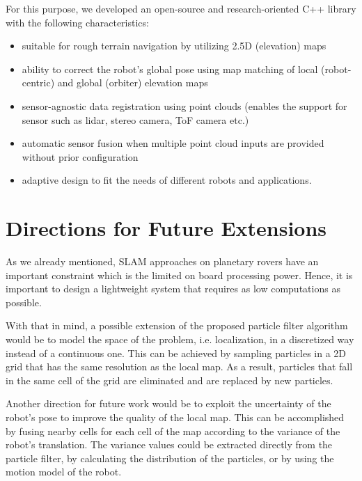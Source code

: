 For this purpose, we developed an open-source and research-oriented
C++ library with the following characteristics:

\begin{itemize}
    \item suitable for rough terrain navigation by utilizing
        2.5D (elevation) maps
    \item ability to correct the robot's global pose using map matching
        of local (robot-centric) and global (orbiter) elevation maps
    \item sensor-agnostic data registration using point clouds
        (enables the support for sensor such as lidar,
        stereo camera, ToF camera etc.)
    \item automatic sensor fusion when multiple point cloud inputs
        are provided without prior configuration
    \item adaptive design to fit the needs of different robots
        and applications.
\end{itemize}

\section{Directions for Future Extensions}

As we already mentioned, SLAM approaches on planetary rovers have an important
constraint which is the limited on board processing power.
Hence, it is important to design a lightweight system that requires as low
computations as possible.

With that in mind, a possible extension of the proposed particle filter
algorithm would be to model the space of the problem, i.e. localization,
in a discretized way instead of a continuous one.
This can be achieved by sampling particles in a 2D grid that has the same
resolution as the local map.
As a result, particles that fall in the same cell of the grid are eliminated
and are replaced by new particles.

Another direction for future work would be to exploit the uncertainty
of the robot's pose to improve the quality of the local map.
This can be accomplished by fusing nearby cells for each cell of the
map according to the variance of the robot's translation.
The variance values could be extracted directly from the particle filter,
by calculating the distribution of the particles, or by using the
motion model of the robot.

